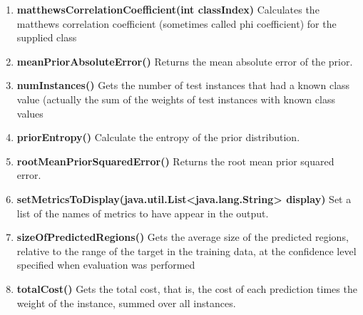 \documentclass[a4paper,12pt, english]{article}
\begin{document}
\begin{enumerate}
          
          



          
\item \textbf{matthewsCorrelationCoefficient(int classIndex)}
          Calculates the matthews correlation coefficient (sometimes called phi coefficient) for the supplied class
          

          
\item \textbf{meanPriorAbsoluteError()}
          Returns the mean absolute error of the prior.
          


\item \textbf{numInstances()}
          Gets the number of test instances that had a known class value (actually the sum of the weights of test instances with known class values

      
      



\item \textbf{priorEntropy()}
          Calculate the entropy of the prior distribution.    
                    
\item \textbf{rootMeanPriorSquaredError()}
          Returns the root mean prior squared error.          
          
          
\item \textbf{setMetricsToDisplay(java.util.List<java.lang.String> display)}
          Set a list of the names of metrics to have appear in the output.          
             
\item \textbf{sizeOfPredictedRegions()}
          Gets the average size of the predicted regions, relative to the range of the target in the training data, at the confidence level specified when evaluation was performed

\item \textbf{totalCost()}
          Gets the total cost, that is, the cost of each prediction times the weight of the instance, summed over all instances.                   


\end{enumerate}
\end{document}
